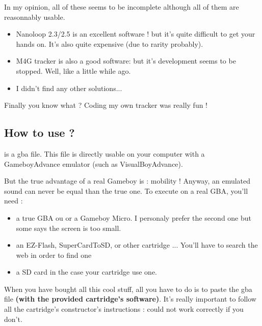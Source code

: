 \documentclass[12pt,a4paper]{article}
\begin{document}
    In my opinion, all of these seems to be incomplete although all of them are reasonnably usable.
    \medskip

    \begin{itemize}
        \item{Nanoloop 2.3/2.5 is an excellent software ! but it's quite difficult to get your hands on. It's also quite expensive (due to rarity probably).}
        \item{M4G tracker is also a good software: but it's development seems to be stopped. Well, like \FAT a little while ago.}
        \item{I didn't find any other solutions...}
    \end{itemize}\medskip

    Finally you know what ? Coding my own tracker was really fun !
    \medskip

    \subsection{How to use \FAT ?}

    \FAT is a gba file. This file is directly usable on your computer with a GameboyAdvance emulator (such as VisualBoyAdvance).
    \medskip

    But the true advantage of a real Gameboy is : mobility !
    Anyway, an emulated sound can never be equal than the true one.
    To execute \FAT on a real GBA, you'll need :
    \medskip

    \begin{itemize}
        \item{a true GBA ou or a Gameboy Micro. I personaly prefer the second one but some says the screen is too small.}
        \item{an EZ-Flash, SuperCardToSD, or other cartridge ... You'll have to search the web in order to find one}
        \item{a SD card in the case your cartridge use one.}
    \end{itemize}\medskip

    When you have bought all this cool stuff, all you have to do is to paste the \FAT gba file {\bf (with the provided cartridge's software)}.
    It's really important to follow all the cartridge's constructor's instructions : \FAT could not work correctly if you don't.

\end{document}

